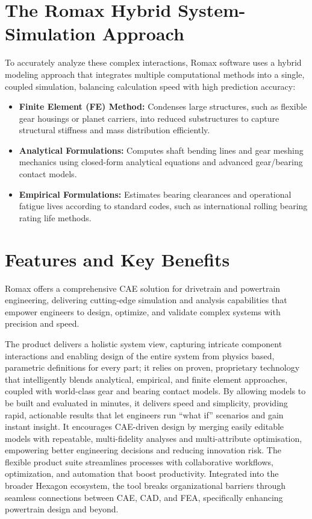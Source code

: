 \section{The Romax Hybrid System-Simulation Approach}
    To accurately analyze these complex interactions, Romax software uses a hybrid modeling 
    approach that integrates multiple computational methods into a single, coupled simulation, 
    balancing calculation speed with high prediction accuracy:
        \begin{itemize}
			\item \textbf{Finite Element (FE) Method:} Condenses large structures, such as flexible gear housings or planet carriers, into reduced substructures to capture structural stiffness and mass distribution efficiently.
			\item \textbf{Analytical Formulations:} Computes shaft bending lines and gear meshing mechanics using closed-form analytical equations and advanced gear/bearing contact models.
			\item \textbf{Empirical Formulations:} Estimates bearing clearances and operational fatigue lives according to standard codes, such as international rolling bearing rating life methods.
		\end{itemize}

\section{Features and Key Benefits}
    Romax offers a comprehensive CAE solution for drivetrain and powertrain engineering, 
    delivering cutting-edge simulation and analysis capabilities that empower engineers to design, 
    optimize, and validate complex systems with precision and speed.

    The product delivers a holistic system view, capturing intricate component interactions and 
    enabling design of the entire system from physics based, parametric definitions for every part; 
    it relies on proven, proprietary technology that intelligently blends analytical, empirical, and 
    finite element approaches, coupled with world-class gear and bearing contact models. By allowing 
    models to be built and evaluated in minutes, it delivers speed and simplicity, providing rapid, 
    actionable results that let engineers run “what if” scenarios and gain instant insight. 
    It encourages CAE-driven design by merging easily editable models with repeatable, multi-fidelity 
    analyses and multi-attribute optimisation, empowering better engineering decisions and reducing 
    innovation risk. The flexible product suite streamlines processes with collaborative workflows, 
    optimization, and automation that boost productivity. Integrated into the broader Hexagon 
    ecosystem, the tool breaks organizational barriers through seamless connections between CAE, 
    CAD, and FEA, specifically enhancing powertrain design and beyond.

